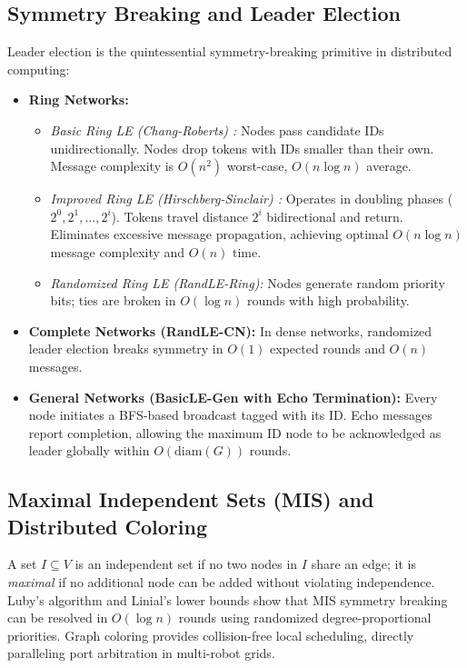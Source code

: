 \documentclass[11pt,a4paper]{report}
\begin{document}
\subsection{Symmetry Breaking and Leader Election}
Leader election is the quintessential symmetry-breaking primitive in distributed computing:
\begin{itemize}
    \item \textbf{Ring Networks:}
    \begin{itemize}
        \item \emph{Basic Ring LE (Chang-Roberts) \cite{chang1979improved}:} Nodes pass candidate IDs unidirectionally. Nodes drop tokens with IDs smaller than their own. Message complexity is $O(n^2)$ worst-case, $O(n \log n)$ average.
        \item \emph{Improved Ring LE (Hirschberg-Sinclair) \cite{hirschberg1980election}:} Operates in doubling phases ($2^0, 2^1, \dots, 2^i$). Tokens travel distance $2^i$ bidirectional and return. Eliminates excessive message propagation, achieving optimal $O(n \log n)$ message complexity and $O(n)$ time.
        \item \emph{Randomized Ring LE (RandLE-Ring):} Nodes generate random priority bits; ties are broken in $O(\log n)$ rounds with high probability.
    \end{itemize}
    \item \textbf{Complete Networks (RandLE-CN):} In dense networks, randomized leader election breaks symmetry in $O(1)$ expected rounds and $O(n)$ messages.
    \item \textbf{General Networks (BasicLE-Gen with Echo Termination):} Every node initiates a BFS-based broadcast tagged with its ID. Echo messages report completion, allowing the maximum ID node to be acknowledged as leader globally within $O(\text{diam}(G))$ rounds.
\end{itemize}

\subsection{Maximal Independent Sets (MIS) and Distributed Coloring}
A set $I \subseteq V$ is an independent set if no two nodes in $I$ share an edge; it is \emph{maximal} if no additional node can be added without violating independence. Luby's algorithm \cite{luby1986simple} and Linial's lower bounds \cite{linial1992locality} show that MIS symmetry breaking can be resolved in $O(\log n)$ rounds using randomized degree-proportional priorities. Graph coloring provides collision-free local scheduling, directly paralleling port arbitration in multi-robot grids.
\end{document}
